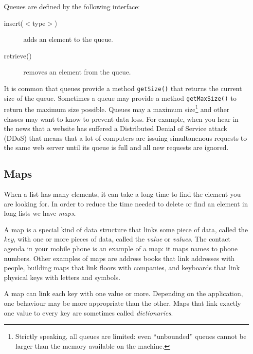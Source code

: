 Queues are defined by the following interface: 

\begin{description}
\item[insert($<$type$>$)] adds an element to the queue.
\item[retrieve() ] removes an element from the queue.
\end{description}

It is common that queues provide a method \verb+getSize()+ that
returns the current size of the queue. Sometimes a queue may provide a
method
\verb+getMaxSize()+ to return the maximum size possible. Queues may a
maximum size\footnote{Strictly speaking, all queues are limited: even
  ``unbounded'' queues cannot be larger than the memory available on
  the machine.} and other classes may want to know to prevent data
loss. For example, when you hear in the news that a website has
suffered a Distributed Denial of Service attack (DDoS) that means that
a lot of computers are issuing simultanenous requests to the same web
server until its queue is full and all new requests are ignored.

\subsection{Maps}
\label{sec:map}

When a list has many elements, it can take a long time to find the
element you are looking for. In order to reduce the time needed to
delete or find an element in long lists we have \emph{maps}.

A map is a special kind of data structure that links some piece of
data, called the \emph{key}, with one or more pieces of data, called
the \emph{value} or \emph{values}. The contact agenda in your mobile
phone is an example of a map: it maps names to phone numbers. Other
examples of maps are address books that link addresses with people,
building maps that link floors with companies, and keyboards that link
physical keys with letters and symbols. 

A map can link each key with one value or more. Depending on the
application, one behaviour may be more appropriate than the
other. Maps that link exactly one value to every key are sometimes
called \emph{dictionaries}. 

